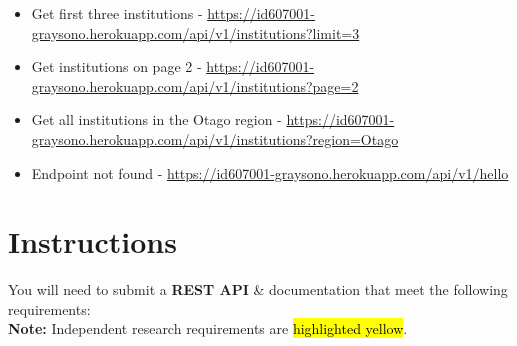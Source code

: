 \documentclass{article}
\begin{document}
\begin{itemize}
	\item Get first three institutions - \href{https://id607001-graysono.herokuapp.com/api/v1/institutions?limit=3}{https://id607001-graysono.herokuapp.com/api/v1/institutions?limit=3}
	\item Get institutions on page 2 - \href{https://id607001-graysono.herokuapp.com/api/v1/institutions?page=2}{https://id607001-graysono.herokuapp.com/api/v1/institutions?page=2}
	\item Get all institutions in the Otago region - \href{https://id607001-graysono.herokuapp.com/api/v1/institutions?region=Otago}{https://id607001-graysono.herokuapp.com/api/v1/institutions?region=Otago}
	\item Endpoint not found - \href{https://id607001-graysono.herokuapp.com/api/v1/hello}{https://id607001-graysono.herokuapp.com/api/v1/hello}
\end{itemize}

\section*{Instructions}
You will need to submit a \textbf{REST API} \& documentation that meet the following requirements: \\

\textbf{Note:} Independent research requirements are \hl{highlighted yellow}.
\end{document}
